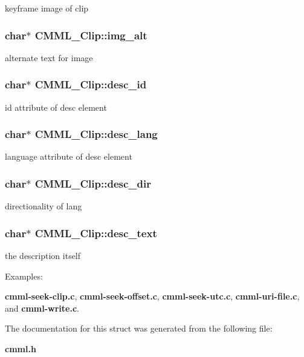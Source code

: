 keyframe image of clip 
\subsubsection{\setlength{\rightskip}{0pt plus 5cm}char$\ast$ {\bf CMML\_\-Clip::img\_\-alt}}\label{structCMML__Clip_o17}


alternate text for image 
\subsubsection{\setlength{\rightskip}{0pt plus 5cm}char$\ast$ {\bf CMML\_\-Clip::desc\_\-id}}\label{structCMML__Clip_o18}


id attribute of desc element 
\subsubsection{\setlength{\rightskip}{0pt plus 5cm}char$\ast$ {\bf CMML\_\-Clip::desc\_\-lang}}\label{structCMML__Clip_o19}


language attribute of desc element 
\subsubsection{\setlength{\rightskip}{0pt plus 5cm}char$\ast$ {\bf CMML\_\-Clip::desc\_\-dir}}\label{structCMML__Clip_o20}


directionality of lang 
\subsubsection{\setlength{\rightskip}{0pt plus 5cm}char$\ast$ {\bf CMML\_\-Clip::desc\_\-text}}\label{structCMML__Clip_o21}


the description itself \begin{Desc}
\item[Examples: ]\par
{\bf cmml-seek-clip.c}, {\bf cmml-seek-offset.c}, {\bf cmml-seek-utc.c}, {\bf cmml-uri-file.c}, and {\bf cmml-write.c}.\end{Desc}


The documentation for this struct was generated from the following file:\begin{CompactItemize}
\item 
{\bf cmml.h}\end{CompactItemize}

